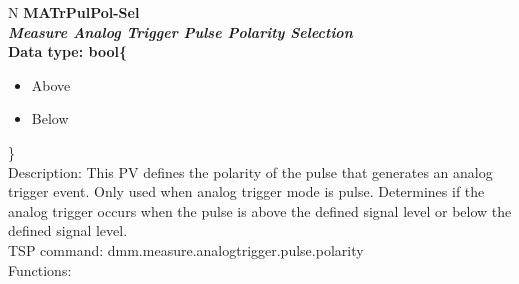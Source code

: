 \documentclass[openany]{article}
\begin{document}
		\begin{tabular}{N}
			\hline
			\bfseries MATrPulPol-Sel\label{pv:matrpulpol-sel} \\ \hline
			\emph{Measure Analog Trigger Pulse Polarity Selection} \\
			Data type: bool\{\begin{itemize}[noitemsep]
				\small
				\item[] Above
				\item[] Below
			\end{itemize}\} \\
			Description: This PV defines the polarity of the pulse that generates an analog trigger event. Only used when analog trigger mode is pulse. Determines if the analog trigger occurs when the pulse is above the defined signal level or below the defined signal level. \\
			TSP command: dmm.measure.analogtrigger.pulse.polarity \\
			Functions: \\
			\arrayrulecolor{\FuncTableBorderColor}

		\end{tabular}
\end{document}
